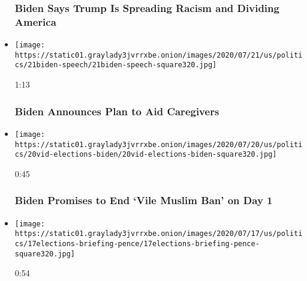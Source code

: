 \begin{itemize}
  \hypertarget{biden-says-trump-is-spreading-racism-and-dividing-america}{%
  \subsubsection{Biden Says Trump Is Spreading Racism and Dividing
  America}\label{biden-says-trump-is-spreading-racism-and-dividing-america}}
\item
  \href{https://www.nytimes3xbfgragh.onion/video/us/100000007249436/biden-announces-plan-to-aid-caregivers.html?action=click\&module=video-series-bar\&region=header\&pgtype=Article\&playlistId=video/2020-Elections}{}

  \texttt{[image: https://static01.graylady3jvrrxbe.onion/images/2020/07/21/us/politics/21biden-speech/21biden-speech-square320.jpg]}

  1:13

  \hypertarget{biden-announces-plan-to-aid-caregivers}{%
  \subsubsection{Biden Announces Plan to Aid
  Caregivers}\label{biden-announces-plan-to-aid-caregivers}}
\item
  \href{https://www.nytimes3xbfgragh.onion/video/us/100000007248132/biden-muslim-voters.html?action=click\&module=video-series-bar\&region=header\&pgtype=Article\&playlistId=video/2020-Elections}{}

  \texttt{[image: https://static01.graylady3jvrrxbe.onion/images/2020/07/20/us/politics/20vid-elections-biden/20vid-elections-biden-square320.jpg]}

  0:45

  \hypertarget{biden-promises-to-end-vile-muslim-ban-on-day-1}{%
  \subsubsection{Biden Promises to End `Vile Muslim Ban' on Day
  1}\label{biden-promises-to-end-vile-muslim-ban-on-day-1}}
\item
  \href{https://www.nytimes3xbfgragh.onion/video/us/100000007244976/pence-calls-out-biden-wisconsin.html?action=click\&module=video-series-bar\&region=header\&pgtype=Article\&playlistId=video/2020-Elections}{}

  \texttt{[image: https://static01.graylady3jvrrxbe.onion/images/2020/07/17/us/politics/17elections-briefing-pence/17elections-briefing-pence-square320.jpg]}

  0:54


\end{itemize}
